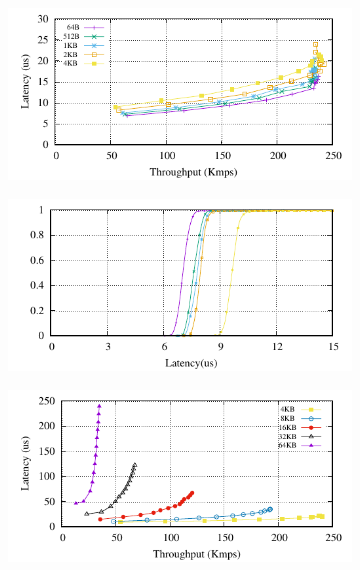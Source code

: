 \begin{figure}[htp!]
  \begin{subfigure}{\columnwidth}
    \centering
    \includegraphics[width=0.99\columnwidth]{figures/benchmark/graphs/figure-performance-vs-size-single-group-up-to-4k}
  \end{subfigure}
  \begin{subfigure}{\columnwidth}
    \centering
    \includegraphics[width=0.99\columnwidth]{figures/benchmark/graphs/figure-performance-vs-size-single-group-cdf-up-to-4k}
  \end{subfigure}
  \begin{subfigure}{\columnwidth}
    \centering
    \includegraphics[width=0.99\columnwidth]{figures/benchmark/graphs/figure-performance-vs-size-single-group-from-4k}

\end{subfigure}
\end{figure}
